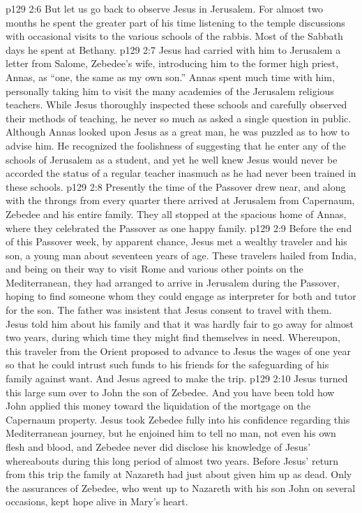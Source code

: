 \pc \vs p129 2:6 But let us go back to observe Jesus in Jerusalem. For almost two months he spent the greater part of his time listening to the temple discussions with occasional visits to the various schools of the rabbis. Most of the Sabbath days he spent at Bethany.
\vs p129 2:7 Jesus had carried with him to Jerusalem a letter from Salome, Zebedee’s wife, introducing him to the former high priest, Annas, as “one, the same as my own son.” Annas spent much time with him, personally taking him to visit the many academies of the Jerusalem religious teachers. While Jesus thoroughly inspected these schools and carefully observed their methods of teaching, he never so much as asked a single question in public. Although Annas looked upon Jesus as a great man, he was puzzled as to how to advise him. He recognized the foolishness of suggesting that he enter any of the schools of Jerusalem as a student, and yet he well knew Jesus would never be accorded the status of a regular teacher inasmuch as he had never been trained in these schools.
\vs p129 2:8 Presently the time of the Passover drew near, and along with the throngs from every quarter there arrived at Jerusalem from Capernaum, Zebedee and his entire family. They all stopped at the spacious home of Annas, where they celebrated the Passover as one happy family.
\pc \vs p129 2:9 Before the end of this Passover week, by apparent chance, Jesus met a wealthy traveler and his son, a young man about seventeen years of age. These travelers hailed from India, and being on their way to visit Rome and various other points on the Mediterranean, they had arranged to arrive in Jerusalem during the Passover, hoping to find someone whom they could engage as interpreter for both and tutor for the son. The father was insistent that Jesus consent to travel with them. Jesus told him about his family and that it was hardly fair to go away for almost two years, during which time they might find themselves in need. Whereupon, this traveler from the Orient proposed to advance to Jesus the wages of one year so that he could intrust such funds to his friends for the safeguarding of his family against want. And Jesus agreed to make the trip.
\vs p129 2:10 Jesus turned this large sum over to John the son of Zebedee. And you have been told how John applied this money toward the liquidation of the mortgage on the Capernaum property. Jesus took Zebedee fully into his confidence regarding this Mediterranean journey, but he enjoined him to tell no man, not even his own flesh and blood, and Zebedee never did disclose his knowledge of Jesus’ whereabouts during this long period of almost two years. Before Jesus’ return from this trip the family at Nazareth had just about given him up as dead. Only the assurances of Zebedee, who went up to Nazareth with his son John on several occasions, kept hope alive in Mary’s heart.
